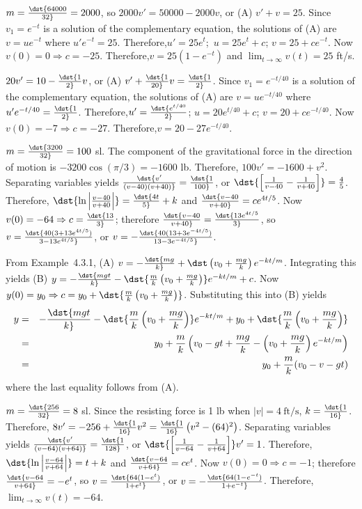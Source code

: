 \documentclass[dvips]{book}
\renewcommand{\exer}[1]{\par\medskip\;\noindent{\color{red}\bf #1.}}
\numberwithin{example}{section}
\numberwithin{equation}{section}
\numberwithin{theorem}{section}
\numberwithin{table}{section}
\numberwithin{figure}{section}
\begin{document}
\exer{4.3.3}
 $m=\dst{64000\over32}=2000$, so
 $2000v'=50000-2000v$, or (A)
$v'+v=25$.
Since $v_1=e^{-t}$ is a solution of the complementary equation,
the solutions of (A) are $v=ue^{-t}$ where $u'e^{-t}=25$.
Therefore,$u'=25e^t$;\ $u=25e^t+c$;\;
$v=25+ce^{-t}$. Now $v(0)=0\Rightarrow
c=-25$. Therefore,$v=25(1-e^{-t})$
and $\lim_{t\to\infty}v(t)=25$ ft/s.


\exer{4.3.4}
 $20v'=10-\dst{1\over2}v$, or (A)
$v'+\dst{1\over20}v=\dst{1\over2}$.
Since $v_1=e^{-t/40}$ is a solution of the complementary equation,
the solutions of (A) are $v=ue^{-t/40}$ where
$u'e^{-t/40}=\dst{1\over2}$. Therefore,$u'=\dst{e^{t/40}\over2}$;\;
$u=20e^{t/40}+c$;\;
$v=20+ce^{-t/40}$. Now $v(0)=-7\Rightarrow
c=-27$. Therefore,$v=20-27e^{-t/40}$.



\exer{4.3.6}
 $m=\dst{3200\over32}=100$ sl. The
component of the gravitational force in the direction of motion is
$-3200\cos(\pi/3)=-1600$ lb. Therefore,
$100v'=-1600+v^2$. Separating variables yields
$\dst{v'\over(v-40)(v+40)}=\dst{1\over100}$, or $\dst{\left[{1\over
v-40}-{1\over v+40}\right]}={4\over5}$. Therefore,
$\dst{\ln\left|v-40\over
v+40\right|}=\dst{4t\over5}+k$ and $\dst{v-40\over v+40}=ce^{4t/5}$.
Now $v(0)=-64\Rightarrow c=\dst{13\over3}$; therefore $\dst{v-40\over
v+40}=\dst{13e^{4t/5}\over3}$, so
$v=\dst{40(3+13e^{4t/5})\over3-13e^{4t/5}}$, or
$v=-\dst{40(13+3e^{-4t/5})\over13-3e^{-4t/5}}$.



\exer{4.3.8}
From Example~4.3.1, (A) $v=-\dst{mg\over
k}+\dst\left(v_0+{mg\over k}\right)e^{-kt/m}$. Integrating this yields
(B) $y=-\dst{mgt\over
k}-\dst{{m\over k}\left(v_0+{mg\over k}\right)}e^{-kt/m}+c$.
Now $y(0)=y_0\Rightarrow c=y_0+\dst{{m\over k}\left(v_0+{mg\over
k}\right)}$. Substituting this into (B) yields
\begin{eqnarray*}
y&=&-\dst{mgt\over
k}-\dst{{m\over k}\left(v_0+{mg\over k}\right)}e^{-kt/m}+
y_0+\dst{{m\over k}\left(v_0+{mg\over k}\right)}\\
&=&y_0+{m\over k}\left(v_0-gt+{mg\over
k}-\left(v_0+{mg\over k}\right)e^{-kt/m}\right)\\
&=&y_0+{m\over k}(v_0-v-gt)
\end{eqnarray*}
where the last equality follows from (A).


\exer{4.3.10}
 $m=\dst{256\over32}=8$ sl.
Since the
resisting force is 1 lb when $|v|=4\ \mbox{ft/s}$,
$k=\dst{1\over16}$.
 Therefore,
$8v'=-256+\dst{1\over16}v^2=\dst{1\over16}\left(v^2-(64)^2\right)$.
Separating variables yields
$\dst{v'\over(v-64)(v+64)}=\dst{1\over128}$, or $\dst{\left[{1\over
v-64}-{1\over v+64}\right]}v'=1$. Therefore,$\dst{\ln\left|v-64\over
v+64\right|}=t+k$ and $\dst{v-64\over v+64}=ce^t$.
Now $v(0)=0\Rightarrow c=-1$; therefore $\dst{v-64\over
v+64}=-e^t$, so
$v=\dst{64(1-e^t)\over1+e^t}$, or
$v=-\dst{64(1-e^{-t})\over1+e^{-t}}$.  Therefore,
$\lim_{t\to\infty}v(t)=-64$.
\end{document}
